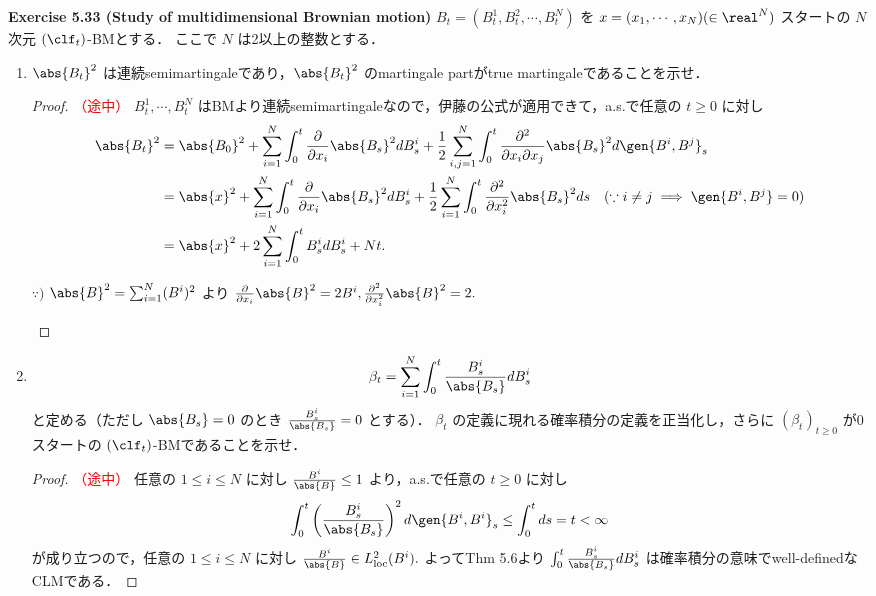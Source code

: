 \documentclass{jsarticle}
\begin{document}
\textbf{Exercise 5.33 (Study of multidimensional Brownian motion)}
$B_t=(B_t^{1},B_t^{2},\dotsb,B_t^{N})$ を $x=(x_1,\dotsb,x_N)(\in\real^N)$ スタートの $N$ 次元 $(\clf_t)$-BMとする．
ここで $N$ は2以上の整数とする．
\begin{enumerate}
    \item
    $\abs{B_t}^2$ は連続semimartingaleであり，$\abs{B_t}^2$ のmartingale partがtrue martingaleであることを示せ．
    \begin{proof}\textcolor{red}{（途中）}
        $B_t^{1},\dotsb,B_t^{N}$ はBMより連続semimartingaleなので，伊藤の公式が適用できて，a.s.で任意の $t\ge0$ に対し
        \begin{align}
            \abs{B_t}^2
            &= \abs{B_0}^2
            + \sum_{i=1}^{N}\int_{0}^{t}\frac{\partial}{\partial x_i}\abs{B_s}^2 dB_s^i
            + \frac{1}{2}\sum_{i,j=1}^{N}\int_{0}^{t}\frac{\partial^2}{\partial x_i\partial x_j}\abs{B_s}^2 d\gen{B^i,B^j}_s \\
            &= \abs{x}^2
            + \sum_{i=1}^{N}\int_{0}^{t}\frac{\partial}{\partial x_i}\abs{B_s}^2 dB_s^i
            + \frac{1}{2}\sum_{i=1}^{N}\int_{0}^{t}\frac{\partial^2}{\partial x_i^2}\abs{B_s}^2 ds
            \quad(\because i\neq j\implies\gen{B^i,B^j}=0)\\
            &= \abs{x}^2
            + 2\sum_{i=1}^{N}\int_{0}^{t}B_s^i dB_s^i
            + Nt.
        \end{align}
        \begin{screen}
            $\because)$ $\abs{B}^2=\sum_{i=1}^{N}(B^i)^2$ より $\frac{\partial}{\partial x_i}\abs{B}^2=2B^i, \frac{\partial^2}{\partial x_i^2}\abs{B}^2=2.$
        \end{screen}
    \end{proof}
    
    \item
    \begin{align}
        \beta_t
        = \sum_{i=1}^{N}\int_{0}^{t}\frac{B_{s}^{i}}{\abs{B_s}}dB_s^i
    \end{align}
    と定める（ただし $\abs{B_s}=0$ のとき $\frac{B_{s}^{i}}{\abs{B_s}}=0$ とする）．
    $\beta_t$ の定義に現れる確率積分の定義を正当化し，さらに $(\beta_t)_{t\ge0}$ が0スタートの $(\clf_t)$-BMであることを示せ．
    \begin{proof}\textcolor{red}{（途中）}
        任意の $1\le i\le N$ に対し $\frac{B^i}{\abs{B}}\le1$ より，a.s.で任意の $t\ge0$ に対し
        \begin{align}
            \int_0^t \left(\frac{B_s^i}{\abs{B_s}}\right)^2 d\gen{B^i, B^i}_s
            \le \int_0^t ds = t < \infty
        \end{align}
        が成り立つので，任意の $1\le i\le N$ に対し $\frac{B^i}{\abs{B}}\in L_{\mathrm{loc}}^2(B^i).$
        よってThm 5.6より $\int_{0}^{t}\frac{B_{s}^{i}}{\abs{B_s}}dB_s^i$ は確率積分の意味でwell-definedなCLMである．


\end{proof}
\end{enumerate}
\end{document}
